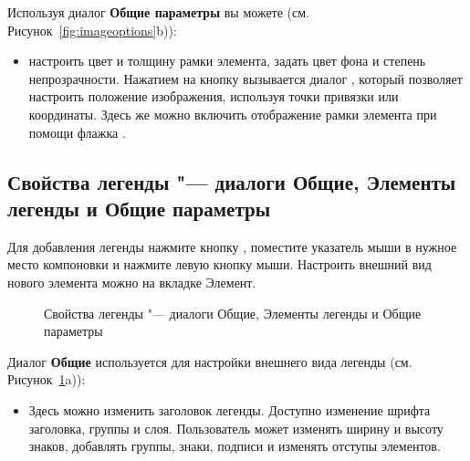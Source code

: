 
Используя диалог \textbf{Общие параметры} вы можете
(см. Рисунок~\ref{fig:imageoptions}b)):

\begin{itemize}[label=--]
\item настроить цвет и толщину рамки элемента, задать
цвет фона и степень непрозрачности. Нажатием на кнопку 
вызывается диалог , который позволяет
настроить положение изображения, используя точки привязки или координаты.
Здесь же можно включить отображение рамки элемента при помощи флажка
.
\end{itemize}

\subsection{Свойства легенды "--- диалоги Общие, Элементы легенды и Общие параметры}

Для добавления легенды нажмите кнопку
, поместите указатель
мыши в нужное место компоновки и нажмите левую кнопку мыши. Настроить
внешний вид нового элемента можно на вкладке Элемент.

\begin{figure}[h]
\centering
   \hspace{1cm}
   \hspace{1cm}
   \caption{Свойства легенды "--- диалоги Общие, Элементы легенды и Общие параметры \nixcaption}\label{fig:legendoptions}
\end{figure}


Диалог \textbf{Общие} используется для настройки внешнего вида
легенды (см. Рисунок~\ref{fig:legendoptions}a)):

\begin{itemize}[label=--]
\item Здесь можно изменить заголовок легенды. Доступно изменение шрифта
заголовка, группы и слоя. Пользователь может изменять ширину и высоту
знаков, добавлять группы, знаки, подписи и изменять отступы элементов.
\end{itemize}

